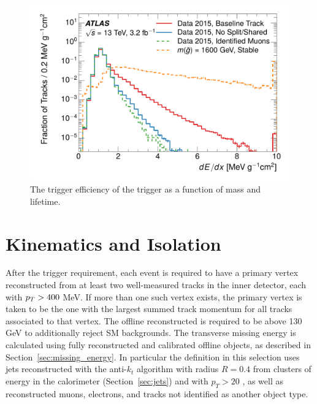 \begin{figure}[h]
\centering
\includegraphics[draft, width=.68\textwidth]{figures/trigger_efficiency.pdf}
\caption{The trigger efficiency of the \met trigger as a function of mass and lifetime.}
\label{fig:trigger_efficiency}
\end{figure}


\section{Kinematics and Isolation}
\label{sec:track_requirements}

After the trigger requirement, each event is required to have a primary vertex reconstructed from at least two well-measured tracks in the inner detector, each with $p_T > 400$ MeV. 
If more than one such vertex exists, the primary vertex is taken to be the one with the largest summed track momentum for all tracks associated to that vertex. 
The offline reconstructed \met is required to be above 130 GeV to additionally reject \ac{SM} backgrounds.
The transverse missing energy is calculated using fully reconstructed and calibrated offline objects, as described in Section~\ref{sec:missing_energy}. 
In particular the \met definition in this selection uses jets reconstructed with the anti-$k_t$ algorithm with radius $R = 0.4$ from clusters of energy in the calorimeter (Section~\ref{sec:jets}) and with $p_T > 20$ \GeV, as well as reconstructed muons, electrons, and tracks not identified as another object type.

